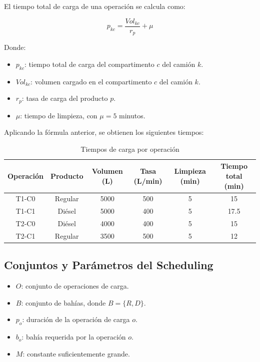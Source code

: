 El tiempo total de carga de una operación se calcula como:

\begin{equation}
    p_{kc} = \frac{Vol_{kc}}{r_p} + \mu
\end{equation}

Donde:

\begin{itemize}
    \item $p_{kc}$: tiempo total de carga del compartimento $c$ del camión $k$.
    \item $Vol_{kc}$: volumen cargado en el compartimento $c$ del camión $k$.
    \item $r_p$: tasa de carga del producto $p$.
    \item $\mu$: tiempo de limpieza, con $\mu = 5$ minutos.
\end{itemize}

Aplicando la fórmula anterior, se obtienen los siguientes tiempos:

\begin{table}[H]
\centering
\caption{Tiempos de carga por operación}
\begin{tabular}{cccccc}
\toprule
Operación & Producto & Volumen (L) & Tasa (L/min) & Limpieza (min) & Tiempo total (min) \\
\midrule
T1-C0 & Regular & 5000 & 500 & 5 & 15 \\
T1-C1 & Diésel & 5000 & 400 & 5 & 17.5 \\
T2-C0 & Diésel & 4000 & 400 & 5 & 15 \\
T2-C1 & Regular & 3500 & 500 & 5 & 12 \\
\bottomrule
\end{tabular}
\end{table}

\subsection{Conjuntos y Parámetros del Scheduling}

\begin{itemize}
    \item $O$: conjunto de operaciones de carga.
    \item $B$: conjunto de bahías, donde $B = \{R,D\}$.
    \item $p_o$: duración de la operación de carga $o$.
    \item $b_o$: bahía requerida por la operación $o$.
    \item $M$: constante suficientemente grande.
\end{itemize}

